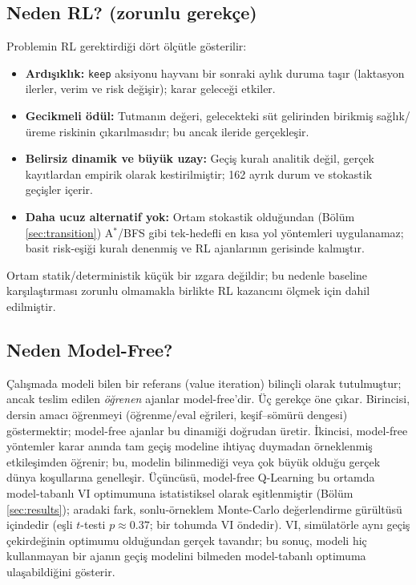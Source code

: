 \documentclass[conference]{IEEEtran}
\begin{document}
\subsection{Neden RL? (zorunlu gerekçe)}
Problemin RL gerektirdiği dört ölçütle gösterilir:
\begin{itemize}
\item \textbf{Ardışıklık:} \texttt{keep} aksiyonu hayvanı bir sonraki aylık duruma
taşır (laktasyon ilerler, verim ve risk değişir); karar geleceği etkiler.
\item \textbf{Gecikmeli ödül:} Tutmanın değeri, gelecekteki süt gelirinden birikmiş
sağlık/üreme riskinin çıkarılmasıdır; bu ancak ileride gerçekleşir.
\item \textbf{Belirsiz dinamik ve büyük uzay:} Geçiş kuralı analitik değil, gerçek
kayıtlardan empirik olarak kestirilmiştir; 162 ayrık durum ve stokastik geçişler içerir.
\item \textbf{Daha ucuz alternatif yok:} Ortam stokastik olduğundan (Bölüm
\ref{sec:transition}) A$^\ast$/BFS gibi tek-hedefli en kısa yol yöntemleri uygulanamaz;
basit risk-eşiği kuralı denenmiş ve RL ajanlarının gerisinde kalmıştır.
\end{itemize}
Ortam statik/deterministik küçük bir ızgara değildir; bu nedenle baseline karşılaştırması
zorunlu olmamakla birlikte RL kazancını ölçmek için dahil edilmiştir.

\subsection{Neden Model-Free?}
Çalışmada modeli bilen bir referans (value iteration) bilinçli olarak tutulmuştur;
ancak teslim edilen \emph{öğrenen} ajanlar model-free'dir. Üç gerekçe öne çıkar.
Birincisi, dersin amacı öğrenmeyi (öğrenme/eval eğrileri, keşif--sömürü dengesi)
göstermektir; model-free ajanlar bu dinamiği doğrudan üretir. İkincisi, model-free
yöntemler karar anında tam geçiş modeline ihtiyaç duymadan örneklenmiş etkileşimden
öğrenir; bu, modelin bilinmediği veya çok büyük olduğu gerçek dünya koşullarına
genelleşir. Üçüncüsü, model-free Q-Learning bu ortamda model-tabanlı VI optimumuna
istatistiksel olarak eşitlenmiştir (Bölüm \ref{sec:results}); aradaki fark, sonlu-örneklem
Monte-Carlo değerlendirme gürültüsü içindedir (eşli $t$-testi $p\approx0.37$; bir tohumda VI
öndedir). VI, simülatörle aynı geçiş çekirdeğinin optimumu olduğundan gerçek tavandır; bu
sonuç, modeli hiç kullanmayan bir ajanın geçiş modelini bilmeden model-tabanlı optimuma
ulaşabildiğini gösterir.
\end{document}
